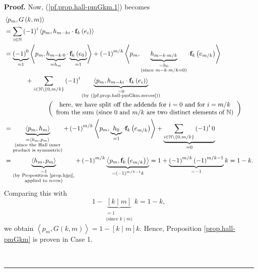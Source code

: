 \documentclass[numbers=enddot,12pt,final,onecolumn,notitlepage]{scrartcl}%
\theoremstyle{definition}
\newenvironment{proof}[1][Proof]{\noindent\textbf{#1.} }{\ \rule{0.5em}{0.5em}}
\let\sumnonlimits\sum
\renewcommand{\sum}{\sumnonlimits\limits}
\begin{document}
\begin{proof}
Now, (\ref{pf.prop.hall-pmGkm.1}) becomes%
\begin{align*}
&  \left\langle p_{m},G\left(  k,m\right)  \right\rangle \\
&  =\sum_{i\in\mathbb{N}}\left(  -1\right)  ^{i}\left\langle p_{m}%
,h_{m-ki}\cdot\mathbf{f}_{k}\left(  e_{i}\right)  \right\rangle \\
&  =\underbrace{\left(  -1\right)  ^{0}}_{=1}\left\langle p_{m}%
,\underbrace{h_{m-k\cdot0}}_{=h_{m}}\cdot\underbrace{\mathbf{f}_{k}\left(
e_{0}\right)  }_{=1}\right\rangle +\left(  -1\right)  ^{m/k}\left\langle
p_{m},\underbrace{h_{m-k\cdot m/k}}_{\substack{=h_{0}\\\text{(since }m-k\cdot
m/k=0\text{)}}}\cdot\mathbf{f}_{k}\left(  e_{m/k}\right)  \right\rangle \\
&  \ \ \ \ \ \ \ \ \ \ +\sum_{i\in\mathbb{N}\setminus\left\{  0,m/k\right\}
}\left(  -1\right)  ^{i}\underbrace{\left\langle p_{m},h_{m-ki}\cdot
\mathbf{f}_{k}\left(  e_{i}\right)  \right\rangle }_{\substack{=0\\\text{(by
(\ref{pf.prop.hall-pmGkm.zeroes}))}}}\\
&  \ \ \ \ \ \ \ \ \ \ \ \ \ \ \ \ \ \ \ \ \left(
\begin{array}
[c]{c}%
\text{here, we have split off the addends for }i=0\text{ and for }i=m/k\\
\text{from the sum (since }0\text{ and }m/k\text{ are two distinct elements of
}\mathbb{N}\text{)}%
\end{array}
\right) \\
&  =\underbrace{\left\langle p_{m},h_{m}\right\rangle }%
_{\substack{=\left\langle h_{m},p_{m}\right\rangle \\\text{(since the Hall
inner}\\\text{product is symmetric)}}}+\left(  -1\right)  ^{m/k}\left\langle
p_{m},\underbrace{h_{0}}_{=1}\cdot\mathbf{f}_{k}\left(  e_{m/k}\right)
\right\rangle +\underbrace{\sum_{i\in\mathbb{N}\setminus\left\{
0,m/k\right\}  }\left(  -1\right)  ^{i}0}_{=0}\\
&  =\underbrace{\left\langle h_{m},p_{m}\right\rangle }%
_{\substack{=1\\\text{(by Proposition \ref{prop.hjpj},}\\\text{applied to
}n=m\text{)}}}+\left(  -1\right)  ^{m/k}\underbrace{\left\langle
p_{m},\mathbf{f}_{k}\left(  e_{m/k}\right)  \right\rangle }_{=\left(
-1\right)  ^{m/k-1}k}=1+\underbrace{\left(  -1\right)  ^{m/k}\left(
-1\right)  ^{m/k-1}}_{=-1}k=1-k.
\end{align*}
Comparing this with%
\[
1-\underbrace{\left[  k\mid m\right]  }_{\substack{=1\\\text{(since }k\mid
m\text{)}}}k=1-k,
\]
we obtain $\left\langle p_{m},G\left(  k,m\right)  \right\rangle =1-\left[
k\mid m\right]  k$. Hence, Proposition \ref{prop.hall-pmGkm} is proven in Case 1.


\end{proof}
\end{document}
